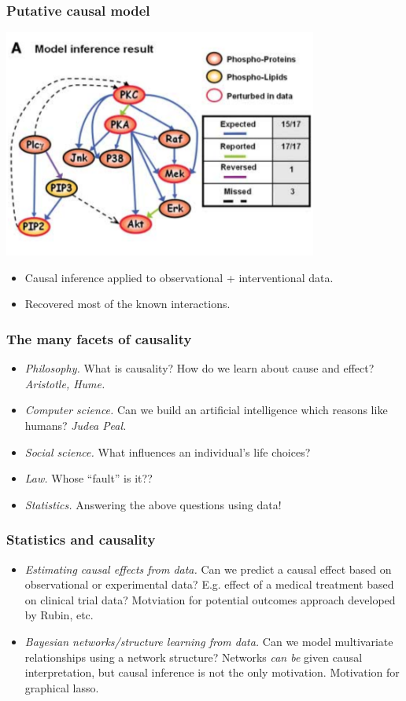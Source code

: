 \documentclass{beamer}
\begin{document}
\begin{frame}
\frametitle{Putative causal model}
\begin{center}
\includegraphics[scale=0.5]{../images/cyto_result_cropped.png}
\end{center}
\begin{itemize}
\item Causal inference applied to observational + interventional data.
\item Recovered most of the known interactions.
\end{itemize}
\end{frame}

\begin{frame}
\frametitle{The many facets of causality}
\begin{itemize}
\item \emph{Philosophy.} What is causality?  How do we learn about cause and effect? \emph{Aristotle, Hume.}
\item \emph{Computer science.}  Can we build an artificial intelligence which reasons like humans? \emph{Judea Peal.}
\item \emph{Social science.}  What influences an individual's life choices? 
\item \emph{Law.} Whose ``fault'' is it??
\item \emph{Statistics.} Answering the above questions using data!
\end{itemize}
\end{frame}

\begin{frame}
\frametitle{Statistics and causality}
\begin{itemize}
\item \emph{Estimating causal effects from data.} Can we predict a causal effect based on observational or experimental data? 
E.g. effect of a medical treatment based on clinical trial data?
Motviation for potential outcomes approach developed by Rubin, etc.
\item \emph{Bayesian networks/structure learning from data.} Can we model multivariate relationships using a network structure?
Networks \emph{can be} given causal interpretation, but causal inference is not the only motivation.
Motivation for graphical lasso.
\end{itemize}
\end{frame}
\end{document}
